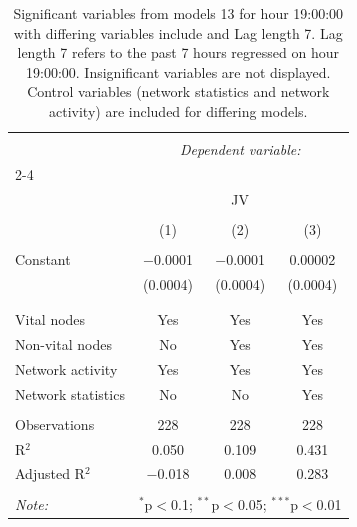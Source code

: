 
\begin{table}[!htbp] \centering 
  \caption{Significant variables from models 13 for hour 19:00:00 with differing variables include 
                               and Lag length 7. Lag length 7 refers to the past 7 hours regressed on hour 19:00:00. 
                               Insignificant variables are not displayed. 
                               Control variables (network statistics and network activity) are 
                               included for differing models.} 
  \label{Jmodels2_t_hourlagged6} 
\scriptsize 
\begin{tabular}{@{\extracolsep{5pt}}lccc} 
\\[-1.8ex]\hline 
\hline \\[-1.8ex] 
 & \multicolumn{3}{c}{\textit{Dependent variable:}} \\ 
\cline{2-4} 
\\[-1.8ex] & \multicolumn{3}{c}{JV} \\ 
\\[-1.8ex] & (1) & (2) & (3)\\ 
\hline \\[-1.8ex] 
 Constant & $-$0.0001 & $-$0.0001 & 0.00002 \\ 
  & (0.0004) & (0.0004) & (0.0004) \\ 
  & & & \\ 
\hline \\[-1.8ex] 
Vital nodes & Yes & Yes & Yes \\ 
Non-vital nodes & No & Yes & Yes \\ 
Network activity & Yes & Yes & Yes \\ 
Network statistics & No & No & Yes \\ 
\hline &  &  &  \\ 
Observations & 228 & 228 & 228 \\ 
R$^{2}$ & 0.050 & 0.109 & 0.431 \\ 
Adjusted R$^{2}$ & $-$0.018 & 0.008 & 0.283 \\ 
\hline 
\hline \\[-1.8ex] 
\textit{Note:}  & \multicolumn{3}{r}{$^{*}$p$<$0.1; $^{**}$p$<$0.05; $^{***}$p$<$0.01} \\ 
\end{tabular} 
\end{table} 

